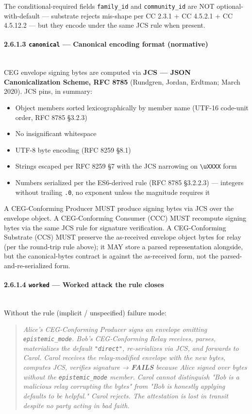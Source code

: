 \documentclass[11pt]{article}
\begin{document}
The conditional-required fields \texttt{family\_id} and \texttt{community\_id} are NOT optional-with-default — substrate rejects mis-shape per CC 2.3.1 + CC 4.5.2.1 + CC 4.5.12.2 — but they encode under the same JCS rule when present.


\paragraph{2.6.1.3 \texttt{canonical} — Canonical encoding format (normative)}\mbox{}\\


CEG envelope signing bytes are computed via \textbf{JCS — JSON Canonicalization Scheme, RFC 8785} (Rundgren, Jordan, Erdtman; March 2020). JCS pins, in summary:


\begin{itemize}\setlength\itemsep{0pt}
\item Object members sorted lexicographically by member name (UTF-16 code-unit order, RFC 8785 §3.2.3)
\item No insignificant whitespace
\item UTF-8 byte encoding (RFC 8259 §8.1)
\item Strings escaped per RFC 8259 §7 with the JCS narrowing on \texttt{\textbackslash{}uXXXX} form
\item Numbers serialized per the ES6-derived rule (RFC 8785 §3.2.2.3) — integers without trailing \texttt{.0}, no exponent unless the magnitude requires it
\end{itemize}


A CEG-Conforming Producer MUST produce signing bytes via JCS over the envelope object. A CEG-Conforming Consumer (CCC) MUST recompute signing bytes via the same JCS rule for signature verification. A CEG-Conforming Substrate (CCS) MUST preserve the as-received envelope object bytes for relay (per the round-trip rule above); it MAY store a parsed representation alongside, but the canonical-bytes contract is against the as-received form, not the parsed-and-re-serialized form.


\paragraph{2.6.1.4 \texttt{worked} — Worked attack the rule closes}\mbox{}\\


Without the rule (implicit / unspecified) failure mode:


\begin{quote}\itshape Alice's CEG-Conforming Producer signs an envelope omitting \texttt{epistemic\_mode}. Bob's CEG-Conforming Relay receives, parses, materializes the default \texttt{"direct"}, re-serializes via JCS, and forwards to Carol. Carol receives the relay-modified envelope with the new bytes, computes JCS, verifies signature → \textbf{FAILS} because Alice signed over bytes without the \texttt{epistemic\_mode} member. Carol cannot distinguish "Bob is a malicious relay corrupting the bytes" from "Bob is honestly applying defaults to be helpful." Carol rejects. The attestation is lost in transit despite no party acting in bad faith.\end{quote}
\end{document}
